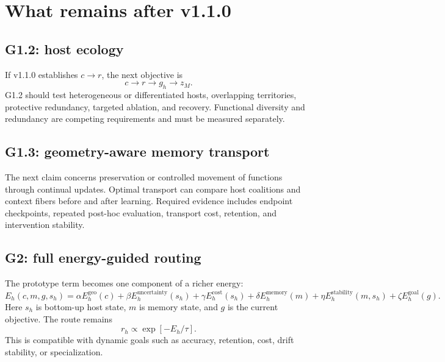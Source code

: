 \documentclass[11pt,a4paper]{article}
\begin{document}
\section{What remains after v1.1.0}

\subsection{G1.2: host ecology}

If v1.1.0 establishes $c\rightarrow r$, the next objective is
\begin{equation}
 c\rightarrow r\rightarrow g_h\rightarrow z_M.
\end{equation}
G1.2 should test heterogeneous or differentiated hosts, overlapping territories, protective redundancy, targeted ablation, and recovery. Functional diversity and redundancy are competing requirements and must be measured separately.

\subsection{G1.3: geometry-aware memory transport}

The next claim concerns preservation or controlled movement of functions through continual updates. Optimal transport can compare host coalitions and context fibers before and after learning. Required evidence includes endpoint checkpoints, repeated post-hoc evaluation, transport cost, retention, and intervention stability.

\subsection{G2: full energy-guided routing}

The prototype term becomes one component of a richer energy:
\begin{equation}
 E_h(c,m,g,s_h)=
 \alpha E_h^{\mathrm{geo}}(c)
 +\beta E_h^{\mathrm{uncertainty}}(s_h)
 +\gamma E_h^{\mathrm{cost}}(s_h)
 +\delta E_h^{\mathrm{memory}}(m)
 +\eta E_h^{\mathrm{stability}}(m,s_h)
 +\zeta E_h^{\mathrm{goal}}(g).
\end{equation}
Here $s_h$ is bottom-up host state, $m$ is memory state, and $g$ is the current objective. The route remains
\begin{equation}
 r_h\propto\exp[-E_h/\tau].
\end{equation}
This is compatible with dynamic goals such as accuracy, retention, cost, drift stability, or specialization.
\end{document}
